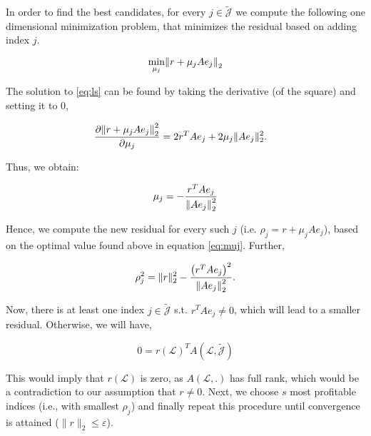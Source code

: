 \documentclass[paper=A4, fontsize=11pt]{scrartcl}
\let\originalleft\left
\let\originalright\right
\renewcommand{\left}{\mathopen{}\mathclose\bgroup\originalleft}
\renewcommand{\right}{\aftergroup\egroup\originalright}
\theoremstyle{remark}
\begin{document}
In order to find the best candidates, for every \(j \in \tilde{\mathcal{J}}\) we compute the following one dimensional minimization problem, that minimizes the residual based on adding index $j$.

\begin{equation}\label{eq:ls}
\min _{\mu_{j}}\left\|r+\mu_{j} A e_{j}\right\|_{2}
\end{equation}

The solution to \eqref{eq:ls} can be found by taking the derivative (of the square) and setting it to 0, 

\begin{equation}
\begin{aligned}
\frac{\partial \left\|r+\mu_{j} A e_{j}\right\|_{2}^2}{\partial \mu_{j}} 
& = 2r^{T} A e_{j} + 2\mu_{j}\|A e_{j}\|_{2}^{2}.
\end{aligned}
\end{equation}

Thus, we obtain: 

\begin{equation}\label{eq:muj}
\mu_{j}=-\frac{r^{T} A e_{j}}{\left\|A e_{j}\right\|_{2}^{2}}
\end{equation}

Hence, we compute the new residual for every such $j$ (i.e.  $\rho_j = r+\mu_{j} A e_{j}$), based on the optimal value found above in equation \eqref{eq:muj}. Further, 

\begin{equation}
\rho_{j}^{2}=\|r\|_{2}^{2}-\frac{\left(r^{T} A e_{j}\right)^{2}}{\left\|A e_{j}\right\|_{2}^{2}}.
\end{equation}

Now, there is at least one index $j \in \tilde{\mathcal{J}}$ s.t. \(r^{T} A e_{j} \neq 0\), which will lead to a smaller residual. Otherwise, we will have, 

\begin{equation}
0=r(\mathcal{L})^{T} A(\mathcal{L}, \tilde{\mathcal{J}})
\end{equation}


This would imply that \(r(\mathcal{L})\) is zero, as \(A(\mathcal{L}, .)\) has full rank, which would be a contradiction to our assumption that $r \neq 0$. Next, we choose $s$ most profitable indices (i.e., with smallest $\rho_j$) and finally repeat this procedure until convergence is attained ($\|r\|_{2} \leq \varepsilon$). 
\end{document}
